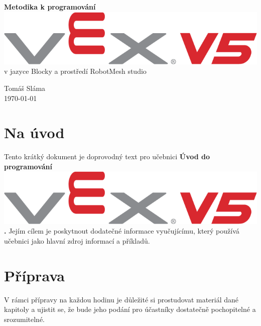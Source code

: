 


\begin{titlepage}
    \begin{center}
        \vspace*{3em}
        \Huge
				\textbf{Metodika k programování} \includegraphics[height=0.65\baselineskip]{Images/vex-logo.png}
				\\
				\Large
        \vspace*{0.5em}
				v jazyce Blocky a prostředí RobotMesh studio

        \vfill

        \flushright
        \normalsize
				Tomáš Sláma\\
				\today
    \end{center}
\end{titlepage}

\tableofcontents
\clearpage

\setcounter{secnumdepth}{0}

\section{Na úvod}
Tento krátký dokument je doprovodný text pro učebnici \textbf{Úvod do programování \includegraphics[height=0.65\baselineskip]{Images/vex-logo.png}.} Jejím cílem je poskytnout dodatečné informace vyučujícímu, který používá učebnici jako hlavní zdroj informací a příkladů.

\errata

\newpage

\section{Příprava}
V rámci přípravy na každou hodinu je důležité si prostudovat materiál dané kapitoly a ujistit se, že bude jeho podání pro účastníky dostatečně pochopitelné a srozumitelné.


